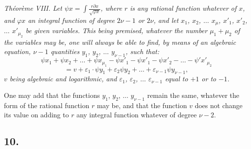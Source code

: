 \documentclass{article}
\begin{document}
\emph{Théorème VIII. Let $\psi x = \displaystyle\int \frac{r\partial x}{\sqrt{\varphi x}}$, where $r$ is any rational function whatever of $x$, and $\varphi x$ an integral function of degree $2\nu-1$ or $2\nu$, and let $x_1$, $x_2$, $\ldots$ $x_\mu$, $x'_1$, $x'_2$, $\ldots$ $x'_{\mu_2}$ be given variables. This being premised, whatever the number $\mu_1+\mu_2$ of the variables may be, one will always be able to find, by means of an algebraic equation, $\nu-1$ quantities $y_1$, $y_2$, $\ldots$ $y_{\nu-1}$, such that:}
\[ \psi x_1 + \psi x_2 + \ldots + \psi x_{\mu_1} - \psi x'_1 - \psi x'_1 - \psi x'_2 - \ldots - \psi' x'_{\mu_2} \tag{39} \]
\[ = v + \varepsilon_1 \cdot \psi y_1 + \varepsilon_2\psi y_2 + \ldots + \varepsilon_{\nu-1}\psi y_{\nu-1}, \]
\emph{$v$ being algebraic and logarithmic, and $\varepsilon_1$, $\varepsilon_2$, $\ldots$ $\varepsilon_{\nu-1}$ equal to $+1$ or to $-1$.}

One may add that the functions $y_1$, $y_2$, $\ldots$ $y_{\nu-1}$ remain the same, whatever the form of the rational function $r$ may be, and that the function $v$ does not change its value on adding to $r$ any integral function whatever of degree $\nu-2$.

\subsection*{10.}
\end{document}
